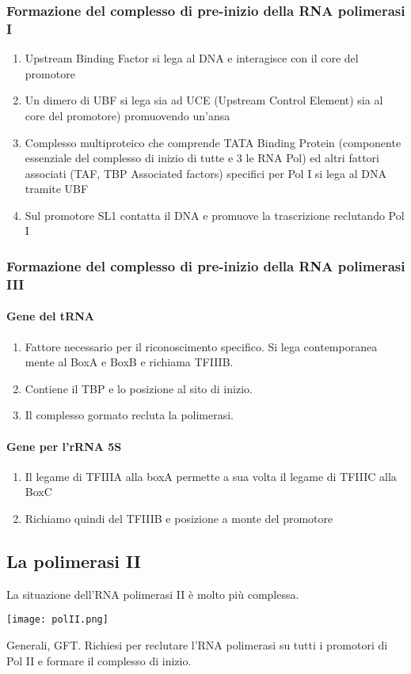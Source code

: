\documentclass{article}
\begin{document}
\subsubsection{Formazione del complesso di pre-inizio della RNA polimerasi I}
\begin{enumerate}
    \item Upstream Binding Factor si lega al DNA e interagisce con il core del promotore
    \item Un dimero di UBF si lega sia ad UCE (Upstream Control Element) sia al core del promotore) promuovendo un'ansa
    \item Complesso multiproteico che comprende TATA Binding Protein (componente essenziale del complesso di inizio di tutte e 3 le RNA Pol) ed altri fattori associati (TAF, TBP Associated factors) specifici per Pol I si lega al DNA tramite UBF
    \item Sul promotore SL1 contatta il DNA e promuove la trascrizione reclutando Pol I
\end{enumerate}
\subsubsection{Formazione del complesso di pre-inizio della RNA polimerasi III}
\paragraph{Gene del tRNA}
\begin{enumerate}
    \item Fattore necessario per il riconoscimento specifico. Si lega contemporanea mente al BoxA e BoxB e richiama TFIIIB.
    \item Contiene il TBP e lo posizione al sito di inizio.
    \item Il complesso gormato recluta la polimerasi.
\end{enumerate}
\paragraph{Gene per l'rRNA 5S}
\begin{enumerate}
    \item Il legame di TFIIIA alla boxA permette a sua volta il legame di TFIIIC alla BoxC
    \item Richiamo quindi del TFIIIB e posizione a monte del promotore
\end{enumerate}
\subsection{La polimerasi II}
La situazione dell'RNA polimerasi II è molto più complessa.
\begin{center}
    \texttt{[image: polII.png]}
\end{center}
Generali, GFT. Richiesi per reclutare l'RNA polimerasi su tutti i promotori di Pol II e formare il complesso di inizio.
\end{document}
